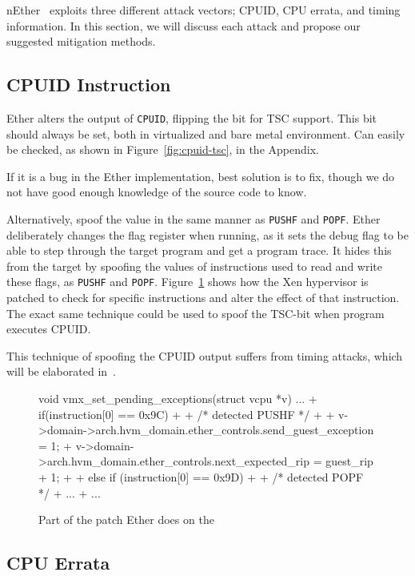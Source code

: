 nEther~\cite{nether} exploits three different attack vectors; CPUID, CPU errata,
and timing information. In this section, we will discuss each attack and
propose our suggested mitigation methods.


\subsection{CPUID Instruction}
\label{sec:approach-cpuid}

Ether alters the output of {\tt CPUID}, flipping the bit for TSC support. This
bit should always be set, both in virtualized and bare metal environment. Can
easily be checked, as shown in Figure~\ref{fig:cpuid-tsc}, in the Appendix.

If it is a bug in the Ether implementation, best solution is to fix, though we
do not have good enough knowledge of the source code to know.

Alternatively, spoof the value in the same manner as {\tt PUSHF} and {\tt POPF}.
Ether deliberately changes the flag register when running, as it sets the debug
flag to be able to step through the target program and get a program trace. It
hides this from the target by spoofing the values of instructions used to read
and write these flags, as {\tt PUSHF} and {\tt POPF}. Figure~\ref{fig:pushf}
shows how the Xen hypervisor is patched to check for specific instructions and
alter the effect of that instruction. The exact same technique could be used to
spoof the TSC-bit when program executes CPUID.

This technique of spoofing the CPUID output suffers from timing attacks, which
will be elaborated in~.

\begin{figure}
\begin{lstc}
void vmx_set_pending_exceptions(struct vcpu *v)
{
    ...
+    if(instruction[0] == 0x9C)
+    {
+         /* detected PUSHF */
+
+         v->domain->arch.hvm_domain.ether_controls.send_guest_exception = 1;
+         v->domain->arch.hvm_domain.ether_controls.next_expected_rip = guest_rip + 1;
+    }
+    else if (instruction[0] == 0x9D)
+    {
+         /* detected POPF */
+         ...
+    }
    ...
}
\end{lstc}
\caption{\label{fig:pushf} Part of the patch Ether does on the }
\end{figure}

\subsection{CPU Errata}
\label{sec:approach-errata}

